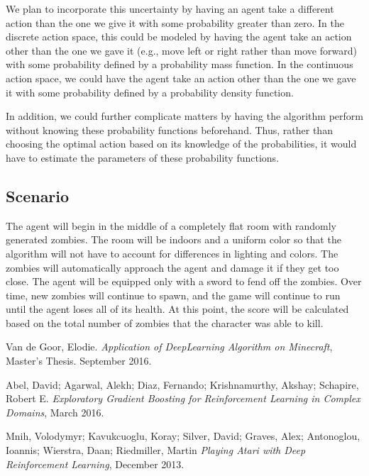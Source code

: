 \documentclass{article}
\begin{document}
We plan to incorporate this uncertainty by having an agent take a different action than the one we give it with some probability greater than zero. In the discrete action space, this could be modeled by having the agent take an action other than the one we gave it (e.g., move left or right rather than move forward) with some probability defined by a probability mass function. In the continuous action space, we could have the agent take an action other than the one we gave it with some probability defined by a probability density function.

In addition, we could further complicate matters by having the algorithm perform without knowing these probability functions beforehand. Thus, rather than choosing the optimal action based on its knowledge of the probabilities, it would have to estimate the parameters of these probability functions.

\subsection{Scenario}

The agent will begin in the middle of a completely flat room with randomly generated zombies.  The room will be indoors and a uniform color so that the algorithm will not have to account for differences in lighting and colors. The zombies will automatically approach the agent and damage it if they get too close. The agent will be equipped only with a sword to fend off the zombies. Over time, new zombies will continue to spawn, and the game will continue to run until the agent loses all of its health. At this point, the score will be calculated based on the total number of zombies that the character was able to kill.

\pagebreak

\begin{thebibliography}{9}

  Van de Goor, Elodie.
  \emph{Application of DeepLearning Algorithm on Minecraft},
  Master's Thesis. September 2016.

  Abel, David; Agarwal, Alekh; Diaz, Fernando; Krishnamurthy, Akshay; Schapire, Robert E.
  \emph{ Exploratory Gradient Boosting for Reinforcement Learning in Complex Domains},
  March 2016.

  Mnih, Volodymyr; Kavukcuoglu, Koray; Silver, David; Graves, Alex; Antonoglou, Ioannis; Wierstra, Daan;   Riedmiller, Martin
  \emph{Playing Atari with Deep Reinforcement Learning},
  December 2013.

\end{thebibliography}

\end{document}
